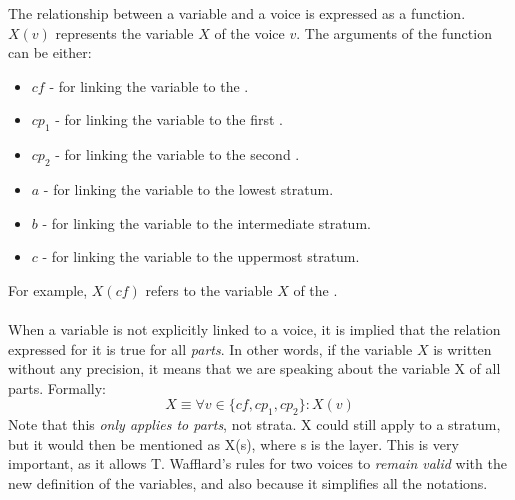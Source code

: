The relationship between a variable and a voice is expressed as a function. $X(v)$ represents the variable $X$ of the voice $v$. The arguments of the function can be either:
\begin{itemize}
    \item $\mathit{cf}$ - for linking the variable to the \cf.
    \item $cp_1$ - for linking the variable to the first \cp.
    \item $cp_2$ - for linking the variable to the second \cp.
    \item $a$ - for linking the variable to the lowest stratum.
    \item $b$ - for linking the variable to the intermediate stratum.
    \item $c$ - for linking the variable to the uppermost stratum.
  \end{itemize}

\noindent For example, $X(\mathit{cf})$ refers to the variable $X$ of the \cf.

\paragraph{}
When a variable is not explicitly linked to a voice, it is implied that the relation expressed for it is true for all \textit{parts}. In other words, if the variable $X$ is written without any precision, it means that we are speaking about the variable X of all parts. Formally:
\begin{equation}
    X \equiv \forall v \in \{\mathit{cf}, cp_1, cp_2\}: X(v)    
\end{equation}
Note that this \textit{only applies to parts}, not strata. X could still apply to a stratum, but it would then be mentioned as X(s), where s is the layer. 
This is very important, as it allows T. Wafflard's rules for two voices to \textit{remain valid} with the new definition of the variables, and also because it simplifies all the notations. 

